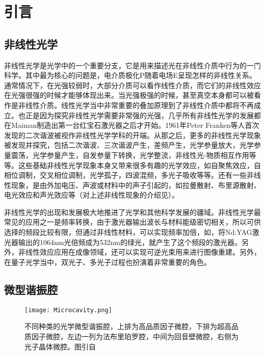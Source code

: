 \chapter{引言}
\label{cha:intro}

\section{非线性光学}

非线性光学是光学中的一个重要分支，它是用来描述光在非线性介质中行为的一门科学。其中最为核心的问题是，电介质极化P随着电场E呈现怎样的非线性关系。通常情况下，在光强较弱时，大部分介质可以看作线性介质，而它们的非线性效应在光强很强的时候才能够体现出来。当光强极强的时候，甚至真空本身都可以被看作是非线性介质。线性光学当中非常重要的叠加原理到了非线性介质中都将不再成立。也正是因为探究非线性光学需要非常强的光强，几乎所有非线性光学的发展都在Maiman制造出第一台红宝石激光器之后才开始\cite{maiman1960stimulated}。1961年Peter Franken等人首次发现的二次谐波被视作非线性光学学科的开端\cite{franken1961generation}。从那之后，更多的非线性光学现象被发现并探究，包括二次谐波、三次谐波产生，差频产生，光学参量放大，光学参量震荡，光学参量产生，自发参量下转换，光学整流，非线性光-物质相互作用等等。这些基础非线性光学现象本身又带来很多有趣的光学效应，如自聚焦效应，自相位调制，交叉相位调制，光学孤子，四波混频，多光子吸收等等。还有一些非线性现象，是由外加电压、声波或材料中的声子引起的，如拉曼散射、布里源散射、电光效应和声光效应等（对上述非线性现象的介绍见\cite{boyd2003nonlinear}）。

非线性光学的出现和发展极大地推进了光学和其他科学发展的疆域。非线性光学最常见的应用之一是频率转换，由于激光器输出波长与材料能级密切相关，所以可供选择的频段比较有限，但通过非线性材料，可以实现频率加倍，如，将Nd:YAG激光器输出的1064nm光倍频成为532nm的绿光，就产生了这个频段的激光器。另外，非线性效应应用在成像领域，还可以实现可逆光束用来进行图像重建。另外，在量子光学当中，双光子、多光子过程也扮演着非常重要的角色\cite{scully1999quantum}。

\section{微型谐振腔}

\begin{figure}
\centering
\texttt{[image: Microcavity.png]}
\caption{不同种类的光学微型谐振腔，上排为高品质因子微腔，下排为超高品质因子微腔，左边一列为法布里珀罗腔，中间为回音壁微腔，右侧为光子晶体微腔。图引自\cite{vahala2003optical}}
\label{pic:Microcavity}
\end{figure}

